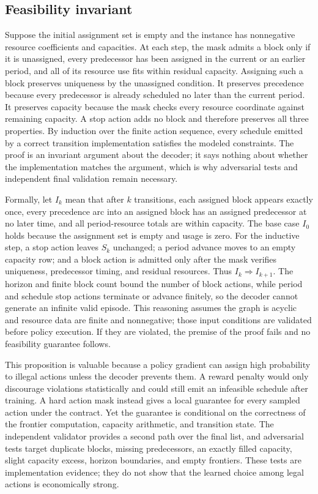 \documentclass[11pt]{article}
\begin{document}
\subsection{Feasibility invariant}
Suppose the initial assignment set is empty and the instance has nonnegative resource coefficients and capacities. At each step, the mask admits a block only if it is unassigned, every predecessor has been assigned in the current or an earlier period, and all of its resource use fits within residual capacity. Assigning such a block preserves uniqueness by the unassigned condition. It preserves precedence because every predecessor is already scheduled no later than the current period. It preserves capacity because the mask checks every resource coordinate against remaining capacity. A stop action adds no block and therefore preserves all three properties. By induction over the finite action sequence, every schedule emitted by a correct transition implementation satisfies the modeled constraints. The proof is an invariant argument about the decoder; it says nothing about whether the implementation matches the argument, which is why adversarial tests and independent final validation remain necessary.

Formally, let $I_k$ mean that after $k$ transitions, each assigned block appears exactly once, every precedence arc into an assigned block has an assigned predecessor at no later time, and all period-resource totals are within capacity. The base case $I_0$ holds because the assignment set is empty and usage is zero. For the inductive step, a stop action leaves $S_k$ unchanged; a period advance moves to an empty capacity row; and a block action is admitted only after the mask verifies uniqueness, predecessor timing, and residual resources. Thus $I_k\Rightarrow I_{k+1}$. The horizon and finite block count bound the number of block actions, while period and schedule stop actions terminate or advance finitely, so the decoder cannot generate an infinite valid episode. This reasoning assumes the graph is acyclic and resource data are finite and nonnegative; those input conditions are validated before policy execution. If they are violated, the premise of the proof fails and no feasibility guarantee follows.

This proposition is valuable because a policy gradient can assign high probability to illegal actions unless the decoder prevents them. A reward penalty would only discourage violations statistically and could still emit an infeasible schedule after training. A hard action mask instead gives a local guarantee for every sampled action under the contract. Yet the guarantee is conditional on the correctness of the frontier computation, capacity arithmetic, and transition state. The independent validator provides a second path over the final list, and adversarial tests target duplicate blocks, missing predecessors, an exactly filled capacity, slight capacity excess, horizon boundaries, and empty frontiers. These tests are implementation evidence; they do not show that the learned choice among legal actions is economically strong.
\end{document}
